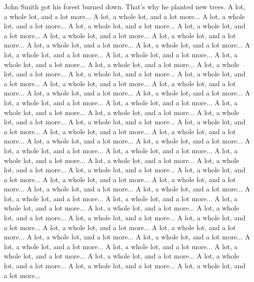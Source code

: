 \documentclass[landscape,a0b,final,a4resizeable]{include/a0poster}
\begin{document}
\begin{poster}
\begin{multicols}{3}
John Smith got his forest burned down.
That's why he planted new trees.
A lot, a whole lot, and a lot more... A lot, a whole lot, and a lot more... A lot, a whole lot, and a lot more... A lot, a whole lot, and a lot more... A lot, a whole lot, and a lot more... A lot, a whole lot, and a lot more... A lot, a whole lot, and a lot more... A lot, a whole lot, and a lot more... A lot, a whole lot, and a lot more... A lot, a whole lot, and a lot more... A lot, a whole lot, and a lot more... A lot, a whole lot, and a lot more... A lot, a whole lot, and a lot more... A lot, a whole lot, and a lot more... A lot, a whole lot, and a lot more... A lot, a whole lot, and a lot more... A lot, a whole lot, and a lot more... A lot, a whole lot, and a lot more... A lot, a whole lot, and a lot more... A lot, a whole lot, and a lot more... A lot, a whole lot, and a lot more... A lot, a whole lot, and a lot more... A lot, a whole lot, and a lot more... A lot, a whole lot, and a lot more... A lot, a whole lot, and a lot more... A lot, a whole lot, and a lot more... A lot, a whole lot, and a lot more... A lot, a whole lot, and a lot more... A lot, a whole lot, and a lot more... A lot, a whole lot, and a lot more... A lot, a whole lot, and a lot more... A lot, a whole lot, and a lot more... A lot, a whole lot, and a lot more... A lot, a whole lot, and a lot more... A lot, a whole lot, and a lot more... A lot, a whole lot, and a lot more... A lot, a whole lot, and a lot more... A lot, a whole lot, and a lot more... A lot, a whole lot, and a lot more... A lot, a whole lot, and a lot more... A lot, a whole lot, and a lot more... A lot, a whole lot, and a lot more... A lot, a whole lot, and a lot more... A lot, a whole lot, and a lot more... A lot, a whole lot, and a lot more... A lot, a whole lot, and a lot more... A lot, a whole lot, and a lot more... A lot, a whole lot, and a lot more... A lot, a whole lot, and a lot more... A lot, a whole lot, and a lot more... A lot, a whole lot, and a lot more... A lot, a whole lot, and a lot more... A lot, a whole lot, and a lot more... A lot, a whole lot, and a lot more... A lot, a whole lot, and a lot more... A lot, a whole lot, and a lot more... A lot, a whole lot, and a lot more... A lot, a whole lot, and a lot more... A lot, a whole lot, and a lot more... A lot, a whole lot, and a lot more...

\end{multicols}
\end{poster}
\end{document}
